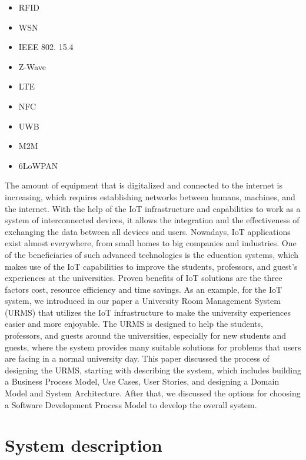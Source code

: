 \documentclass[conference,onecolumn]{IEEEtran}
\begin{document}
\begin{multicols}{2} %
	\begin{center}
		\begin{itemize}
			\item RFID
			\item WSN
			\item IEEE 802. 15.4
			\item Z-Wave
			\item LTE
			\item NFC
			\item UWB
			\item M2M
			\item 6LoWPAN	
		\end{itemize}
	\end{center}
\end{multicols}
	
The amount of equipment that is digitalized and connected to the internet is increasing, which requires establishing networks between humans, machines, and the internet. With the help of the IoT infrastructure and capabilities to work as a system of interconnected devices, it allows the integration and the effectiveness of exchanging the data between all devices and users. Nowadays, IoT applications exist almost everywhere, from small homes to big companies and industries. One of the beneficiaries of such advanced technologies is the education systems, which makes use of the IoT capabilities to improve the students, professors, and guest’s experiences at the universities. Proven benefits of IoT solutions are the three factors cost, resource efficiency and time savings. As an example, for the IoT system, we introduced in our paper a University Room Management System (URMS) that utilizes the IoT infrastructure to make the university experiences easier and more enjoyable. The URMS is designed to help the students, professors, and guests around the universities, especially for new students and guests, where the system provides many suitable solutions for problems that users are facing in a normal university day. 
This paper discussed the process of designing the URMS, starting with describing the system, which includes building a Business Process Model, Use Cases, User Stories, and designing a Domain Model and System Architecture. After that, we discussed the options for choosing a Software Development Process Model to develop the overall system. 


\section{System description}
\end{document}
